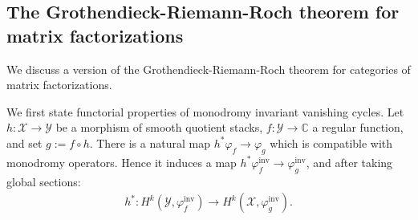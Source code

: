 \documentclass [11pt,oneside,a4paper,mathscr]{amsart}
\theoremstyle{definition}
\newtheorem{remark}[thm]{Remark}
\newcommand{\X}{\mathscr{X}}
\begin{document}







\subsection{The Grothendieck-Riemann-Roch theorem for matrix factorizations}


We discuss a version of the Grothendieck-Riemann-Roch theorem for categories of matrix factorizations. 

We first state functorial properties of monodromy invariant vanishing cycles. 
Let $h\colon \X\to\mathscr{Y}$ be a morphism of smooth quotient stacks, 
$f \colon \mathscr{Y} \to \mathbb{C}$ a regular function, 
and set $g:=f\circ h$. 
There is a natural map $h^* \varphi_f \to \varphi_g$ which 
is compatible with monodromy operators. 
Hence it induces a map $h^* \varphi_f^{\mathrm{inv}} \to 
\varphi_g^{\mathrm{inv}}$, and after taking global sections:
\begin{align*}
    h^* \colon H^k(\mathscr{Y}, \varphi_f^{\mathrm{inv}}) \to H^k(\X, \varphi_g^{\mathrm{inv}}). 
\end{align*}
\end{document}

